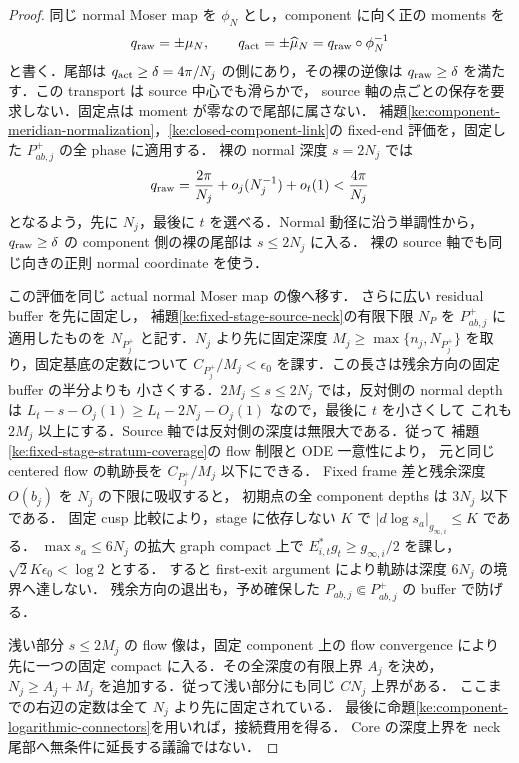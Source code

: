 \begin{proof}
同じ normal Moser map を $\phi_N$ とし，component に向く正の moments を
\[
 q_{\rm raw}=\pm\mu_N,\qquad
 q_{\rm act}=\pm\widehat\mu_N=q_{\rm raw}\circ\phi_N^{-1}
\]
と書く．尾部は $q_{\rm act}\ge\delta=4\pi/N_j$ の側にあり，その裸の逆像は
$q_{\rm raw}\ge\delta$ を満たす．この transport は source 中心でも滑らかで，
source 軸の点ごとの保存を要求しない．固定点は moment が零なので尾部に属さない．
補題\ref{ke:component-meridian-normalization}，\ref{ke:closed-component-link}の
fixed-end 評価を，固定した $P^+_{ab,j}$ の全 phase に適用する．
裸の normal 深度 $s=2N_j$ では
\[
 q_{\rm raw}=\frac{2\pi}{N_j}+o_j(N_j^{-1})+o_t(1)<\frac{4\pi}{N_j}
\]
となるよう，先に $N_j$，最後に $t$ を選べる．Normal 動径に沿う単調性から，
$q_{\rm raw}\ge\delta$ の component 側の裸の尾部は $s\le2N_j$ に入る．
裸の source 軸でも同じ向きの正則 normal coordinate を使う．

この評価を同じ actual normal Moser map の像へ移す．
さらに広い residual buffer を先に固定し，
補題\ref{ke:fixed-stage-source-neck}の有限下限 $N_P$ を $P^+_{ab,j}$ に適用したものを
$N_{P^+_j}$ と記す．$N_j$ より先に固定深度
$M_j\ge\max\{n_j,N_{P^+_j}\}$ を取り，固定基底の定数について
$C_{P^+_j}/M_j<\epsilon_0$ を課す．この長さは残余方向の固定 buffer の半分よりも
小さくする．$2M_j\le s\le2N_j$ では，反対側の normal depth は
$L_t-s-O_j(1)\ge L_t-2N_j-O_j(1)$ なので，最後に $t$ を小さくして
これも $2M_j$ 以上にする．Source 軸では反対側の深度は無限大である．従って
補題\ref{ke:fixed-stage-stratum-coverage}の flow 制限と ODE 一意性により，
元と同じ centered flow の軌跡長を $C_{P^+_j}/M_j$ 以下にできる．
Fixed frame 差と残余深度 $O(b_j)$ を $N_j$ の下限に吸収すると，
初期点の全 component depths は $3N_j$ 以下である．
固定 cusp 比較により，stage に依存しない $K$ で
$|d\log s_a|_{g_{\infty,i}}\le K$ である．
$\max s_a\le6N_j$ の拡大 graph compact 上で
$E_{i,t}^*g_t\ge g_{\infty,i}/2$ を課し，
$\sqrt2K\epsilon_0<\log2$ とする．
すると first-exit argument により軌跡は深度 $6N_j$ の境界へ達しない．
残余方向の退出も，予め確保した $P_{ab,j}\Subset P^+_{ab,j}$ の buffer で防げる．

浅い部分 $s\le2M_j$ の flow 像は，固定 component 上の flow convergence により
先に一つの固定 compact に入る．その全深度の有限上界 $A_j$ を決め，
$N_j\ge A_j+M_j$ を追加する．従って浅い部分にも同じ $CN_j$ 上界がある．
ここまでの右辺の定数は全て $N_j$ より先に固定されている．
最後に命題\ref{ke:component-logarithmic-connectors}を用いれば，接続費用を得る．
Core の深度上界を neck 尾部へ無条件に延長する議論ではない．
\end{proof}

